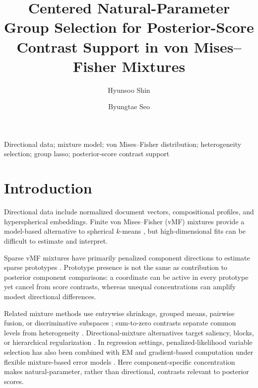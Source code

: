 \documentclass[preprint,12pt,authoryear]{elsarticle}
\def\corref#1{}%
\begin{document}
\begin{frontmatter}
\title{Centered Natural-Parameter Group Selection for Posterior-Score Contrast Support in von Mises--Fisher Mixtures}
\author[aff1]{Hyunsoo Shin}
\author[aff1]{Byungtae Seo\corref{cor1}}
\address[aff1]{Department of Statistics, Sungkyunkwan University, Seoul 03063, Republic of Korea}
\begin{abstract}
\end{abstract}
\begin{keyword}Directional data; mixture model; von Mises--Fisher distribution; heterogeneity selection; group lasso; posterior-score contrast support\end{keyword}
\end{frontmatter}

\section{Introduction}

Directional data include normalized document vectors, compositional
profiles, and hyperspherical embeddings. Finite von Mises--Fisher (vMF)
mixtures provide a model-based alternative to spherical $k$-means
\citep{banerjee2005vmf}, but high-dimensional fits can be difficult to estimate
and interpret.

Sparse vMF mixtures have primarily penalized component directions to estimate
sparse prototypes \citep{rossi2022sparsevmf}. Prototype presence is not the
same as contribution to posterior component comparisons: a coordinate can be
active in every prototype yet cancel from score contrasts, whereas unequal
concentrations can amplify modest directional differences.

Related mixture methods use entrywise shrinkage, grouped means, pairwise
fusion, or discriminative subspaces
\citep{pan2007penalized,xie2008grouped,guo2010pairwise,
bouveyron2012fisher,bouveyron2014sparsefisher}; sum-to-zero contrasts separate
common levels from heterogeneity \citep{bondell2009anova}. Directional-mixture
alternatives target saliency, blocks, or hierarchical regularization
\citep{amayri2013online,salah2016coclustering,gopal2014vmf,
taghia2014bayesian,salah2019directional}. In regression settings,
penalized-likelihood variable selection has also been combined with EM and
gradient-based computation under flexible mixture-based error models
\citep{park2025penalized}. Here
component-specific concentration
makes natural-parameter, rather than directional, contrasts relevant to
posterior scores.
\end{document}
